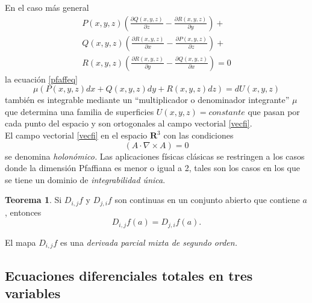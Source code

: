 \documentclass{article}
\theoremstyle{definition} \newtheorem{defi}{Definici\'on}
\theoremstyle{definition} \newtheorem{teo}{Teorema}
\theoremstyle{definition} \newtheorem{cor}{Corolario}
\begin{document}
En el caso m\'as general
\begin{align}
P \left(x,y,z\right)\left(\frac{\partial Q \left(x,y,z\right)}{\partial z} - \frac{\partial R \left(x,y,z\right)}{\partial y}\right) +\nonumber \\
Q \left(x,y,z\right)\left(\frac{\partial R \left(x,y,z\right)}{\partial x} - \frac{\partial P \left(x,y,z\right)}{\partial z}\right) +\nonumber \\
R \left(x,y,z\right)\left(\frac{\partial R \left(x,y,z\right)}{\partial y} - \frac{\partial Q \left(x,y,z\right)}{\partial x}\right) = 0
\end{align}
la ecuaci\'on \eqref{pfaffeq}
\begin{equation}
\mu \left( P\left(x,y,z\right)dx + Q\left(x,y,z\right)dy + R\left(x,y,z\right)dz \right) = dU\left(x,y,z\right)
\end{equation}
tambi\'en es integrable mediante un ``multiplicador o denominador integrante'' $\mu$ que determina una familia de superficies $U\left(x,y,z\right) = constante$ que pasan por cada punto del espacio y son ortogonales al campo vectorial \eqref{vecfi}.\\
El campo vectorial \eqref{vecfi} en el espacio $\mathbf{R}^3$ con las condiciones
\begin{equation}
\left( A \cdot \nabla \times A \right) = 0
\end{equation}
se denomina \emph{holon\'omico.}
Las aplicaciones f\'isicas cl\'asicas se restringen a los casos donde la dimensi\'on Pfaffiana es menor o igual a 2, tales son los casos en los que se tiene un dominio de \emph{integrabilidad \'unica}.

\begin{teo}
Si $D_{i,j}f$ y $D_{j,i}f$ son continuas en un conjunto abierto que contiene $a$, entonces
$$D_{i,j}f(a)=D_{j,i}f(a).$$
\end{teo}
El mapa $D_{i,j}f$ es una \emph{derivada parcial mixta de segundo orden.} 

\subsection{Ecuaciones diferenciales totales en tres variables}\label{exem}
\end{document}
